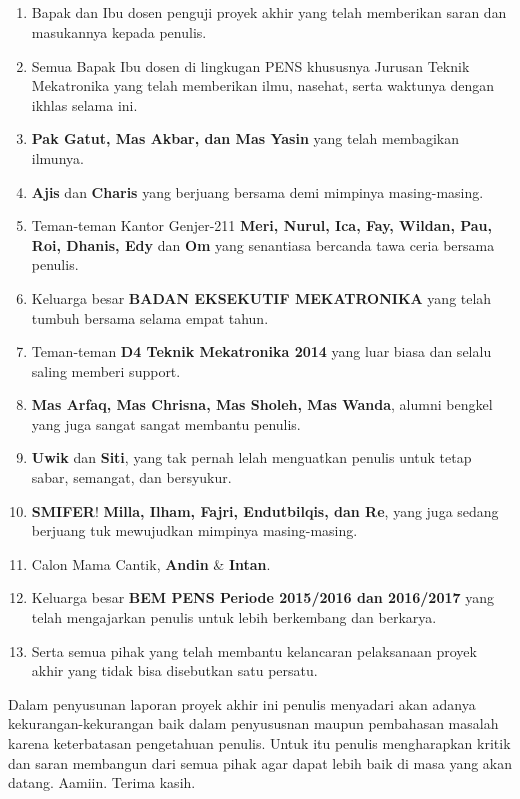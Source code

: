 \begin{dedication}
    \chapter*{}
    \addtocounter{page}{-1}
    \thispagestyle{empty} 
    \NewPage
    \begin{enumerate}
    \setcounter{enumi}{\value{nameOfYourChoice}}
    \item Bapak dan Ibu dosen penguji proyek akhir yang telah memberikan saran dan masukannya kepada penulis.
    \item Semua Bapak Ibu dosen di lingkugan PENS khususnya Jurusan Teknik Mekatronika yang telah memberikan ilmu, nasehat, serta waktunya dengan ikhlas selama ini.
    \item \textbf{Pak Gatut, Mas Akbar, dan Mas Yasin} yang telah membagikan ilmunya.
    \item \textbf{Ajis} dan \textbf{Charis} yang berjuang bersama demi mimpinya masing-masing.
    \item Teman-teman Kantor Genjer-211 \textbf{Meri, Nurul, Ica, Fay, Wildan, Pau, Roi, Dhanis, Edy} dan \textbf{Om} yang senantiasa bercanda tawa ceria bersama penulis.
    \item Keluarga besar \textbf{BADAN EKSEKUTIF MEKATRONIKA} yang telah tumbuh bersama selama empat tahun.
    \item Teman-teman \textbf{D4 Teknik Mekatronika 2014} yang luar biasa dan selalu saling memberi support.
    \item \textbf{Mas Arfaq, Mas Chrisna, Mas Sholeh, Mas Wanda}, alumni bengkel yang juga sangat sangat membantu penulis.
    \item \textbf{Uwik} dan \textbf{Siti}, yang tak pernah lelah menguatkan penulis untuk tetap sabar, semangat, dan bersyukur.
    \item \textbf{SMIFER}! \textbf{Milla, Ilham, Fajri, Endutbilqis, dan Re}, yang juga sedang berjuang tuk mewujudkan mimpinya masing-masing.
    \item Calon Mama Cantik, \textbf{Andin} \& \textbf{Intan}.
    \item Keluarga besar \textbf{BEM PENS Periode 2015/2016 dan 2016/2017} yang telah mengajarkan penulis untuk lebih berkembang dan berkarya.
    \item Serta semua pihak yang telah membantu kelancaran pelaksanaan proyek akhir yang tidak bisa disebutkan satu persatu.
\end{enumerate} 

Dalam penyusunan laporan proyek akhir ini penulis menyadari akan adanya kekurangan-kekurangan baik dalam penyususnan maupun pembahasan masalah karena keterbatasan pengetahuan penulis. Untuk itu penulis mengharapkan kritik dan saran membangun dari semua pihak agar dapat lebih baik di masa yang akan datang. Aamiin. Terima kasih.

\end{dedication}

